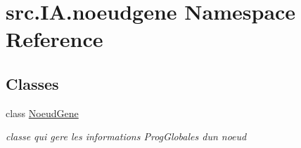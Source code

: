 \hypertarget{namespacesrc_1_1_i_a_1_1noeudgene}{}\section{src.\+I\+A.\+noeudgene Namespace Reference}
\label{namespacesrc_1_1_i_a_1_1noeudgene}
\subsection*{Classes}
\begin{DoxyCompactItemize}
\item 
class \hyperlink{classsrc_1_1_i_a_1_1noeudgene_1_1_noeud_gene}{Noeud\+Gene}
\begin{DoxyCompactList}\small\item\em classe qui gere les informations Prog\+Globales d\textquotesingle{}un noeud \end{DoxyCompactList}\end{DoxyCompactItemize}
